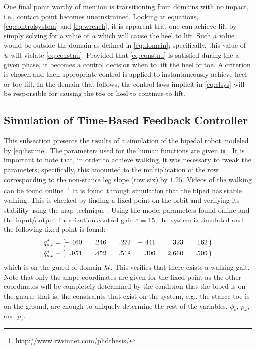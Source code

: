 \begin{remark}
  One final point worthy of mention is transitioning from domains with no
  impact, i.e., contact point becomes unconstrained.
  Looking at equations, \eqref{eq:controlsystem} and \eqref{eq:wrench}, it is
  apparent that one can achieve lift by simply solving for a value of $u$
  which will cause the heel to lift.
  Such a value would be outside the domain as defined in \eqref{eq:domain};
  specifically, this value of $u$ will violate \eqref{eq:constnu}.
  Provided that \eqref{eq:constnu} is satisfied during the a given phase, it
  becomes a control decision when to lift the heel or toe.
  A criterion is chosen and then appropriate control is applied to
  instantaneously achieve heel or toe lift.
  In the domain that follows, the control laws implicit in \eqref{eq:clsys} will
  be responsible for causing the toe or heel to continue to lift.
\end{remark}

\subsection{Simulation of Time-Based Feedback Controller} \label{sec:timesim}

This subsection presents the results of a simulation of the bipedal robot
modeled by \eqref{eq:hstime}.
%
The parameters used for the human functions are given in .
%
It is important to note that, in order to achieve walking, it was necessary to
tweak the parameters;
%
specifically, this amounted to the multiplication of the row corresponding to
the non-stance leg slope (row six) by $1.25$.
%
Videos of the walking can be found online.%
%
\footnote{\url{http://www.rwsinnet.com/phdthesis/}\label{fn:rwsinnet}}\xspace
%
It is found through simulation that the biped has stable walking.
%
This is checked by finding a fixed point on the orbit and verifying its
stability using the \Poincare{} map technique \cite{Parker1989}.
%
Using the model parameters found online and the
input/output linearization control gain $\varepsilon = 15$, the system is
simulated and the following fixed point is found:
%
\begin{align}
  q_{s,t}^{*} =
  \left(\!\!\!\!\begin{array}{c c c c c c}
    -.460 & \hphantom{-}.246 & \hphantom{-}.272 & -.441 & \hphantom{-0}.323 &
    \hphantom{-}.162
  \end{array}\!\!\right)\\
  {\dot q}_{s,t}^{*} =
  \left(\!\!\!\!\begin{array}{c c c c c c}
    -.951 & \hphantom{-}.452 & \hphantom{-}.518 & -.309 & -2.660 & -.509
  \end{array}\!\!\right)
\end{align}
which is on the guard of domain $\mathit{hl}$.
%
This verifies that there exists a walking gait.
%
Note that only the shape coordinates are given for the fixed point as the other
coordinates will be completely determined by the condition that the biped is on
the guard;
%
that is, the constraints that exist on the system, e.g., the stance toe is on
the ground, are enough to uniquely determine the rest of the variables,
$\phi_b$, $p_x$, and $p_z$.

